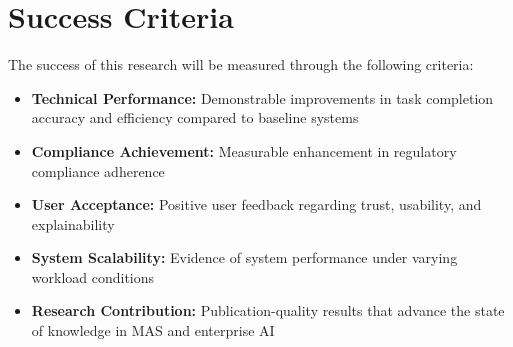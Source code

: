\section{Success Criteria}

The success of this research will be measured through the following criteria:

\begin{itemize}
    \item \textbf{Technical Performance:} Demonstrable improvements in task completion accuracy and efficiency compared to baseline systems
    \item \textbf{Compliance Achievement:} Measurable enhancement in regulatory compliance adherence
    \item \textbf{User Acceptance:} Positive user feedback regarding trust, usability, and explainability
    \item \textbf{System Scalability:} Evidence of system performance under varying workload conditions
    \item \textbf{Research Contribution:} Publication-quality results that advance the state of knowledge in MAS and enterprise AI
\end{itemize}
